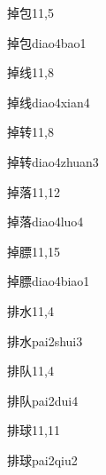 \begin{entry}{掉包}{11,5}
  \begin{phonetics}{掉包}{diao4bao1}
  \end{phonetics}
\end{entry}

\begin{entry}{掉线}{11,8}
  \begin{phonetics}{掉线}{diao4xian4}
  \end{phonetics}
\end{entry}

\begin{entry}{掉转}{11,8}
  \begin{phonetics}{掉转}{diao4zhuan3}
  \end{phonetics}
\end{entry}

\begin{entry}{掉落}{11,12}
  \begin{phonetics}{掉落}{diao4luo4}
  \end{phonetics}
\end{entry}

\begin{entry}{掉膘}{11,15}
  \begin{phonetics}{掉膘}{diao4biao1}
  \end{phonetics}
\end{entry}

\begin{entry}{排水}{11,4}
  \begin{phonetics}{排水}{pai2shui3}
  \end{phonetics}
\end{entry}

\begin{entry}{排队}{11,4}
  \begin{phonetics}{排队}{pai2dui4}
  \end{phonetics}
\end{entry}

\begin{entry}{排球}{11,11}
  \begin{phonetics}{排球}{pai2qiu2}
  \end{phonetics}
\end{entry}

